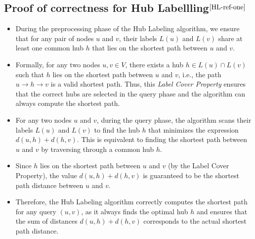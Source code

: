 \begin{appendices}
\section{Proof of correctness for Hub Labellling$^{\cite{HL-ref-one}}$}\label{appendix:Hub Labelling:correctness}
	\begin{itemize}
		\item During the preprocessing phase of the Hub Labeling algorithm, we ensure that for any pair of nodes $ u $ and $ v $, their labels $ L(u) $ and $ L(v) $ share at least one common hub $ h $ that lies on the shortest path between $ u $ and $ v $.
		\item Formally, for any two nodes $ u, v \in V $, there exists a hub $ h \in L(u) \cap L(v) $ such that $ h $ lies on the shortest path between $ u $ and $ v $, i.e., the path $ u \to h \to v $ is a valid shortest path. Thus, this \textit{Label Cover Property} ensures that the correct hubs are selected in the query phase and the algorithm can always compute the shortest path.
		\item For any two nodes $ u $ and $ v $, during the query phase, the algorithm scans their labels $ L(u) $ and  $ L(v) $ to find the hub $ h $ that minimizes the expression $ d(u, h) + d(h, v) $. This is equivalent to finding the shortest path between $ u $  and $ v $ by traversing through a common hub $ h $.
		\item Since $ h $ lies on the shortest path between $ u $ and $ v $ (by the Label Cover Property), the value $ d(u, h) + d(h, v) $ is guaranteed to be the shortest path distance between $ u $ and $ v $.
		\item Therefore, the Hub Labeling algorithm correctly computes the shortest path for any query $ (u, v) $, as it always finds the optimal hub $ h $ and ensures that the sum of distances $ d(u, h) + d(h, v) $ corresponds to the actual shortest path distance.
	\end{itemize}


\end{appendices}

